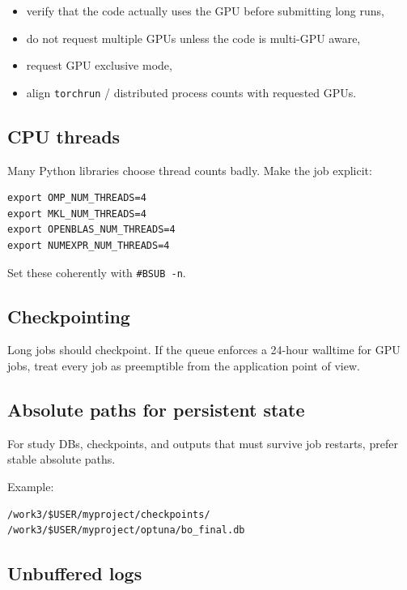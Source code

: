 \documentclass[11pt,a4paper]{article}
\begin{document}
\begin{itemize}[leftmargin=1.5em]
  \item verify that the code actually uses the GPU before submitting long runs,
  \item do not request multiple GPUs unless the code is multi-GPU aware,
  \item request GPU exclusive mode,
  \item align \texttt{torchrun} / distributed process counts with requested GPUs.
\end{itemize}

\subsection{CPU threads}

Many Python libraries choose thread counts badly. Make the job explicit:

\begin{lstlisting}[style=shell]
export OMP_NUM_THREADS=4
export MKL_NUM_THREADS=4
export OPENBLAS_NUM_THREADS=4
export NUMEXPR_NUM_THREADS=4
\end{lstlisting}

Set these coherently with \texttt{\#BSUB -n}.

\subsection{Checkpointing}

Long jobs should checkpoint.
If the queue enforces a 24-hour walltime for GPU jobs, treat every job as preemptible from the application point of view.

\subsection{Absolute paths for persistent state}

For study DBs, checkpoints, and outputs that must survive job restarts, prefer stable absolute paths.

Example:
\begin{lstlisting}[style=shell]
/work3/$USER/myproject/checkpoints/
/work3/$USER/myproject/optuna/bo_final.db
\end{lstlisting}

\subsection{Unbuffered logs}
\end{document}
